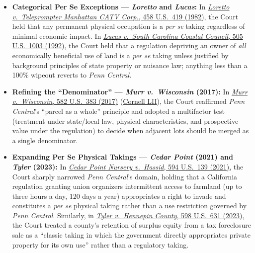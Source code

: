 \documentclass[12pt]{article}
\begin{document}
\begin{itemize}

\item \textbf{Categorical Per Se Exceptions --- \textit{Loretto} and \textit{Lucas}:} In \href{https://supreme.justia.com/cases/federal/us/458/419/}{\textit{Loretto v.\ Teleprompter Manhattan CATV Corp.}, 458 U.S.\ 419 (1982)}, the Court held that any permanent physical occupation is a \textit{per se} taking regardless of minimal economic impact. In \href{https://supreme.justia.com/cases/federal/us/505/1003/}{\textit{Lucas v.\ South Carolina Coastal Council}, 505 U.S.\ 1003 (1992)}, the Court held that a regulation depriving an owner of \textit{all} economically beneficial use of land is a \textit{per se} taking unless justified by background principles of state property or nuisance law; anything less than a 100\% wipeout reverts to \textit{Penn Central}.
  \item \textbf{Refining the ``Denominator'' --- \textit{Murr v.\ Wisconsin} (2017):} In \href{https://supreme.justia.com/cases/federal/us/582/15-214/}{\textit{Murr v.\ Wisconsin}, 582 U.S.\ 383 (2017)} (\href{https://www.law.cornell.edu/supremecourt/text/15-214}{Cornell LII}), the Court reaffirmed \textit{Penn Central}'s ``parcel as a whole'' principle and adopted a multifactor test (treatment under state/local law, physical characteristics, and prospective value under the regulation) to decide when adjacent lots should be merged as a single denominator.
  \item \textbf{Expanding Per Se Physical Takings --- \textit{Cedar Point} (2021) and \textit{Tyler} (2023):} In \href{https://supreme.justia.com/cases/federal/us/594/20-107/}{\textit{Cedar Point Nursery v.\ Hassid}, 594 U.S.\ 139 (2021)}, the Court sharply narrowed \textit{Penn Central}'s domain, holding that a California regulation granting union organizers intermittent access to farmland (up to three hours a day, 120 days a year) appropriates a right to invade and constitutes a \textit{per se} physical taking rather than a use restriction governed by \textit{Penn Central}. Similarly, in \href{https://supreme.justia.com/cases/federal/us/598/22-166/}{\textit{Tyler v.\ Hennepin County}, 598 U.S.\ 631 (2023)}, the Court treated a county's retention of surplus equity from a tax foreclosure sale as a ``classic taking in which the government directly appropriates private property for its own use'' rather than a regulatory taking.

\end{itemize}
\end{document}
